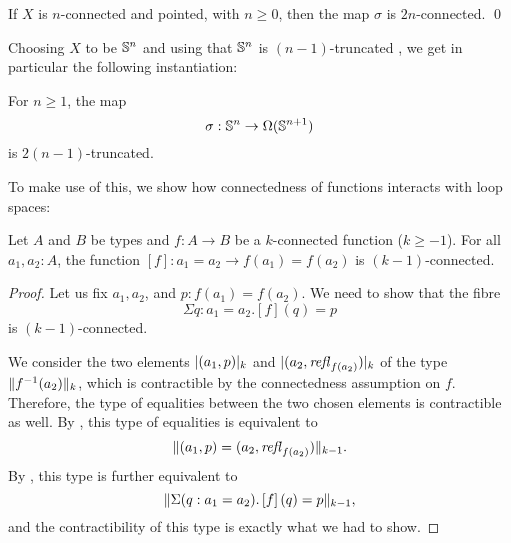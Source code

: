 \documentclass[english,a4]{article}
\renewcommand{\ap}[1]{\left[{#1}\right]}
\begin{document}
\begin{theorem} \label{thm:freudenthal}
    If $X$ is $n$-connected and pointed, with $n \geq 0$, then the map $\sigma$ is $2n$-connected. \qed
\end{theorem}


Choosing $X$ to be $\Sn n$ and using that $\Sn n$ is $(n-1)$-truncated \cite[Corollary 8.2.2]{HoTT}, we get in particular the following instantiation:


\begin{corollary} \label{cor:sigma-truncated}
For $n \geq 1$, the map
\begin{equation} 
\sigma : \Sn n \to \Omega(\Sn {n+1})
\end{equation}
is $2(n-1)$-truncated.
\end{corollary}


To make use of this, we show how connectedness of functions interacts with loop spaces:

\begin{lemma} \label{lem:conn-ap}
    Let $A$ and $B$ be types and $f : A \to B$ be a $k$-connected function ($k \geq -1$).
    For all $a_1, a_2 : A$, the function $\ap f : a_1 = a_2 \to f(a_1) = f(a_2)$ is $(k-1)$-connected.
\end{lemma}
\begin{proof}
    Let us fix $a_1, a_2$, and $p : f(a_1) = f(a_2)$.
    We need to show that the fibre
    \begin{equation}
        \Sigma q : a_1 = a_2. \ap{f}(q) = p
    \end{equation}
    is $(k-1)$-connected.
    
    We consider the two elements 
    $\highertrunc k {(a_1, p)}$ 
    and  
    $\highertrunc k {(a_2, \refl {f(a_2)})}$ of 
    the type $\higherTrunc k {f^{-1}(a_2)}$, which is contractible by the connectedness assumption on $f$.
    Therefore, the type of equalities between the two chosen elements is contractible as well.
    By \cite[Theorem 7.3.12]{HoTT}, this type of equalities is equivalent to
    \begin{equation} \label{eq:eq-in-truncated-fibre}
    \higherTrunc {k-1} {(a_1, p) = (a_2, \refl {f(a_2)})}.
    \end{equation} 
    By \cite[Theorem 2.7.2 and todo-find-number]{HoTT}, 
    this type is further equivalent to
    \begin{equation}
    \higherTrunc {k-1} {\Sigma(q : a_1 = a_2). \ap f(q) = p},
    \end{equation} 
    and the contractibility of this type is exactly what we had to show.
\end{proof}
\end{document}
